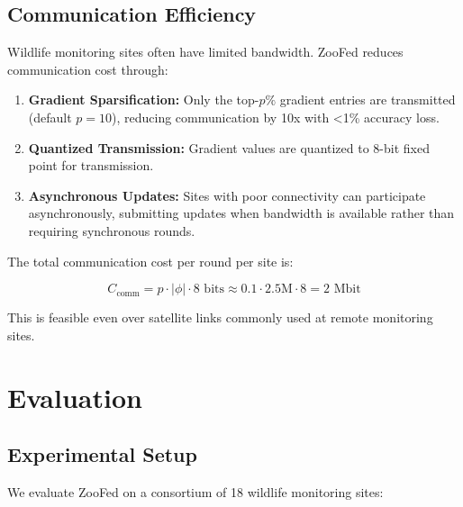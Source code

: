 \documentclass[11pt,a4paper]{article}
\begin{document}
\subsection{Communication Efficiency}

Wildlife monitoring sites often have limited bandwidth.
ZooFed reduces communication cost through:

\begin{enumerate}[leftmargin=*]
    \item \textbf{Gradient Sparsification:} Only the top-$p\%$ gradient entries are transmitted (default $p=10$), reducing communication by 10x with <1\% accuracy loss.
    \item \textbf{Quantized Transmission:} Gradient values are quantized to 8-bit fixed point for transmission.
    \item \textbf{Asynchronous Updates:} Sites with poor connectivity can participate asynchronously, submitting updates when bandwidth is available rather than requiring synchronous rounds.
\end{enumerate}

The total communication cost per round per site is:

\begin{equation}
    C_{\text{comm}} = p \cdot |\phi| \cdot 8 \text{ bits} \approx 0.1 \cdot 2.5\text{M} \cdot 8 = 2 \text{ Mbit}
\end{equation}

This is feasible even over satellite links commonly used at remote monitoring sites.

\section{Evaluation}
\label{sec:evaluation}

\subsection{Experimental Setup}

We evaluate ZooFed on a consortium of 18 wildlife monitoring sites:
\end{document}
